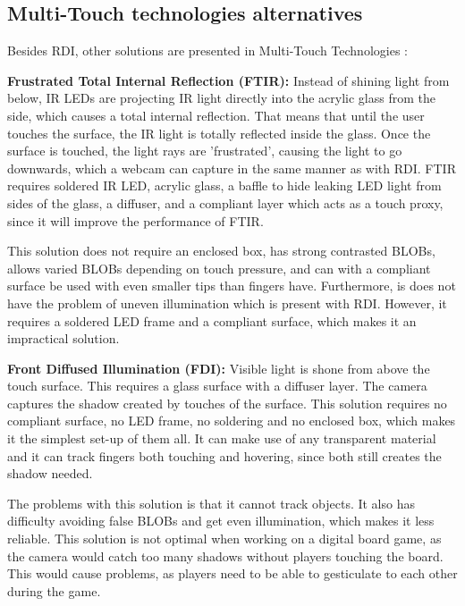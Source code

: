 \subsection{Multi-Touch technologies alternatives}\label{technologiesAlternatives}
Besides RDI, other solutions are presented in Multi-Touch Technologies \citep{multiTT}:

\textbf{Frustrated Total Internal Reflection (FTIR):} Instead of shining light from below, IR LEDs are projecting IR light directly into the acrylic glass from the side, which causes a total internal reflection. That means that until the user touches the surface, the IR light is totally reflected inside the glass. Once the surface is touched, the light rays are 'frustrated', causing the light to go downwards, which a webcam can capture in the same manner as with RDI. FTIR requires soldered IR LED, acrylic glass, a baffle to hide leaking LED light from sides of the glass, a diffuser, and a compliant layer which acts as a touch proxy, since it will improve the performance of FTIR.

This solution does not require an enclosed box, has strong contrasted BLOBs, allows varied BLOBs depending on touch pressure, and can with a compliant surface be used with even smaller tips than fingers have. Furthermore, is does not have the problem of uneven illumination which is present with RDI. However, it requires a soldered LED frame and a compliant surface, which makes it an impractical solution.

\textbf{Front Diffused Illumination (FDI):} Visible light is shone from above the touch surface. This requires a glass surface with a diffuser layer. The camera captures the shadow created by touches of the surface. This solution requires no compliant surface, no LED frame, no soldering and no enclosed box, which makes it the simplest set-up of them all. It can make use of any transparent material and it can track fingers both touching and hovering, since both still creates the shadow needed.

The problems with this solution is that  it cannot track objects. It also has difficulty avoiding false BLOBs and get even illumination, which makes it less reliable. This solution is not optimal when working on a digital board game, as the camera would catch too many shadows without players touching the board. This would cause problems, as players need to be able to gesticulate to each other during the game.

